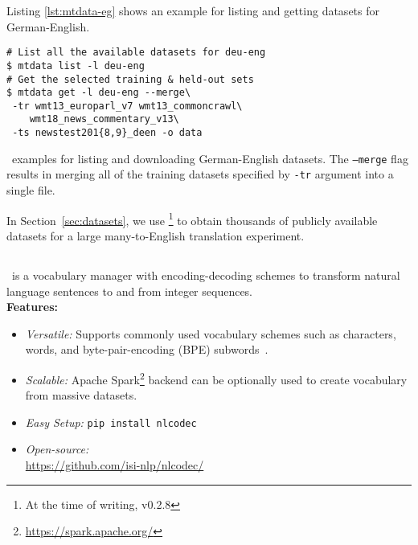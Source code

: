 Listing \ref{lst:mtdata-eg} shows an example for listing and getting datasets for German-English.
\begin{listing}
\begin{verbatim}
# List all the available datasets for deu-eng
$ mtdata list -l deu-eng
# Get the selected training & held-out sets
$ mtdata get -l deu-eng --merge\
 -tr wmt13_europarl_v7 wmt13_commoncrawl\ 
    wmt18_news_commentary_v13\
 -ts newstest201{8,9}_deen -o data
\end{verbatim}
\caption{\mtdata\ examples for listing and downloading German-English datasets.
The \texttt{--merge} flag results in merging all of the training datasets specified by \texttt{-tr} argument into a single file. }
\label{lst:mtdata-eg}
\end{listing}
 In Section~\ref{sec:datasets}, we use \mtdata\footnote{At the time of writing, v0.2.8} to obtain thousands of publicly available datasets for a large many-to-English translation experiment.

\subsection{\nlcodec}
\label{sec:nlcodec}
\nlcodec\ is a vocabulary manager with encoding-decoding schemes to transform natural language sentences to and from integer sequences.\\
\textbf{Features:}
\begin{itemize}[noitemsep,topsep=0pt,leftmargin=4mm]
\item \textit{Versatile:} Supports commonly used vocabulary schemes such as characters, words, and byte-pair-encoding (BPE) subwords~\cite{sennrich-etal-2016-bpe}.
\item \textit{Scalable:} Apache Spark\footnote{\url{https://spark.apache.org/}}\cite{zaharia2016spark} backend can be optionally used to create vocabulary from massive datasets.
\item \textit{Easy Setup:} \texttt{pip install nlcodec} 
\item \textit{Open-source:}\\ \url{https://github.com/isi-nlp/nlcodec/}
\end{itemize}

